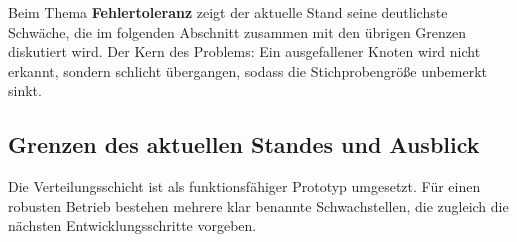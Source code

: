 Beim Thema \textbf{Fehlertoleranz} zeigt der aktuelle Stand seine deutlichste
Schwäche, die im folgenden Abschnitt zusammen mit den übrigen Grenzen diskutiert
wird. Der Kern des Problems: Ein ausgefallener Knoten wird nicht erkannt, sondern
schlicht übergangen, sodass die Stichprobengröße unbemerkt sinkt.

\subsection{Grenzen des aktuellen Standes und Ausblick}
\label{subsec:cluster-grenzen}

Die Verteilungsschicht ist als funktionsfähiger Prototyp umgesetzt. Für einen
robusten Betrieb bestehen mehrere klar benannte Schwachstellen, die zugleich die
nächsten Entwicklungsschritte vorgeben.

